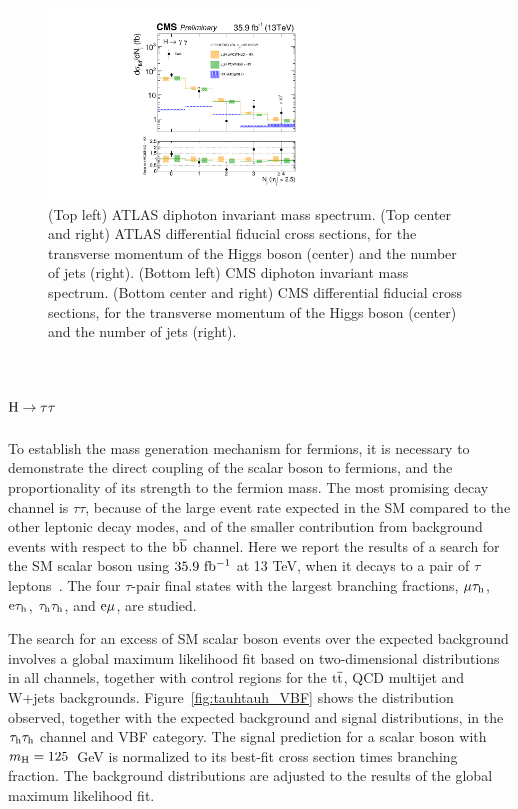 \documentclass[10pt]{article}
\begin{document}
\begin{figure}[htb]
\includegraphics[height=2in]{figures/CMS-HIG-17-015__Figure_004-b__njets.pdf}
\caption{
  (Top left) ATLAS diphoton invariant mass spectrum.
  (Top center and right) ATLAS differential fiducial cross sections, for the
  transverse momentum of the Higgs boson (center) and the number of jets (right).
  (Bottom left) CMS diphoton invariant mass spectrum.
  (Bottom center and right) CMS differential fiducial cross sections, for the
  transverse momentum of the Higgs boson (center) and the number of jets (right).
}
\label{fig:figure-gg}
\end{figure}


\section{\boldmath ${\rm H}\to\tau\tau$}

To establish the mass generation mechanism for fermions, it is necessary to
demonstrate the direct coupling of the scalar boson to fermions, and the
proportionality of its strength to the fermion mass. The most promising decay
channel is $\tau\tau$, because of the large event rate expected in the SM
compared to the other leptonic decay modes, and of the smaller contribution
from background events with respect to the ${\rm b\bar{b}}$ channel. Here we
report the results of a search for the SM scalar boson using $35.9~{\rm fb^{-1}}$
at 13 TeV, when it decays to a pair of $\tau$ leptons~\cite{CMS:2017wyg}. The
four $\tau$-pair final states with the largest branching fractions,
$\mu\tau_{\rm h}$, ${\rm e}\tau_{\rm h}$, $\tau_{\rm h}\tau_{\rm h}$, and
${\rm e}\mu$, are studied.


The search for an excess of SM scalar boson events over the expected background
involves a global maximum likelihood fit based on two-dimensional distributions
in all channels, together with control regions for the ${\rm t{\bar t}}$, QCD
multijet and W+jets backgrounds. Figure~\ref{fig:tauhtauh_VBF} shows the
distribution observed, together with the expected background and signal
distributions, in the $\tau_{\rm h}\tau_{\rm h}$ channel and VBF category. The
signal prediction for a scalar boson with $m_{\rm H} = 125$~GeV is
normalized to its best-fit cross section times branching fraction. The background
distributions are adjusted to the results of the global maximum likelihood fit.
\end{document}
